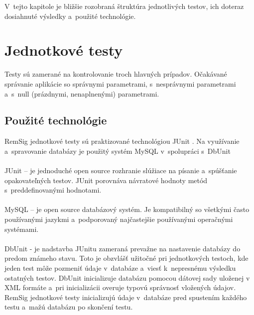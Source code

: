 \documentclass[
  printed, %
  table,   %
oneside,
  nolof,     %
  nolot,     %
]{fithesis3}
\begin{document}
  V~tejto kapitole je bližšie rozobraná štruktúra jednotlivých testov, ich doteraz dosiahnuté výsledky a~použité technológie.
\section{Jednotkové testy}
Testy sú zamerané na kontrolovanie troch hlavných prípadov. Očakávané správanie aplikácie so správnymi parametrami, s~nesprávnymi parametrami a~s~null (prázdnymi, nenaplnenými) parametrami.
\subsection{Použité technológie}
RemSig jednotkové testy sú praktizované technológiou  JUnit \cite{junit}. Na využívanie a~spravovanie databázy je použitý systém MySQL \cite{mySqlBible} v~spolupráci s~DbUnit \cite{dbunit}\paragraph{}
JUnit – je jednoduché open source rozhranie slúžiace na písanie a~spúšťanie opakovateľných testov. JUnit porovnáva návratové hodnoty metód s~preddefinovanými hodnotami.  \paragraph{}
MySQL – je open source databázový systém. Je kompatibilný so všetkými často používanými jazykmi a~podporovaný najčastejšie používanými operačnými systémami.
\paragraph{}
DbUnit -  je nadstavba JUnitu zameraná prevažne na nastavenie databázy do predom známeho stavu. Toto je obzvlášť užitočné pri jednotkových testoch, kde jeden test môže pozmeniť údaje v~databáze a~viesť k~nepresnému výsledku ostatných testov. DbUnit inicializuje databázu pomocou  dátovej sady uloženej v XML formáte a~pri inicializácii overuje typovú správnosť vložených údajov. 
RemSig jednotkové testy inicializujú údaje v~databáze pred  spustením  každého testu a~mažú databázu po skončení testu.  
\end{document}

